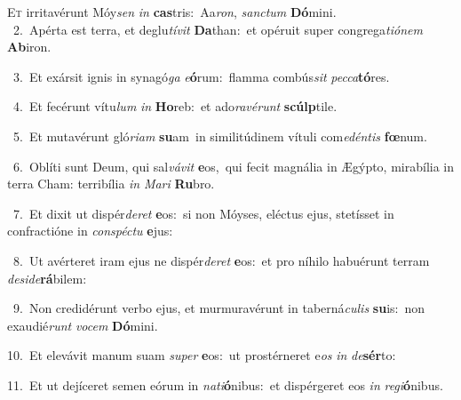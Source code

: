 \lettrine{\initial\textcolor{\initialcolor}{E}}{t} irritavérunt Móy\textit{sen} \textit{in} \textbf{cas}\-tris:~\star Aa\-\textit{ron}\-, \textit{sanc}\-\textit{tum} \textbf{Dó}\-mini.\\
{\numbfont\textcolor{\numbcolor}{~2.}}~Apérta est terra, et deglu\-\textit{tí}\-\textit{vit} \textbf{Da}\-than:~\star et opéruit super congrega\-\textit{ti}\-\textit{ó}\textit{nem} \textbf{Ab}\-iron.\par
{\numbfont\textcolor{\numbcolor}{~3.}}~Et exársit ignis in synagó\textit{ga} \textit{e}\-\textbf{ó}rum:~\star flamma combús\textit{sit} \textit{pec}\-\textit{ca}\textbf{tó}res.\par
{\numbfont\textcolor{\numbcolor}{~4.}}~Et fecérunt vítu\textit{lum} \textit{in} \textbf{Ho}\-reb:~\star et ado\-\textit{ra}\-\textit{vé}\textit{runt} \textbf{scúlp}\-tile.\par
{\numbfont\textcolor{\numbcolor}{~5.}}~Et mutavérunt gló\-\textit{ri}\-\textit{am} \textbf{su}\-am~\star in similitúdinem vítuli com\-\textit{e}\-\textit{dén}\textit{tis} \textbf{fœ}\-num.\par
{\numbfont\textcolor{\numbcolor}{~6.}}~Oblíti sunt Deum, qui sal\-\textit{vá}\-\textit{vit} \textbf{e}\-os,~\star qui fecit magnália in Ægýpto, mirabília in terra Cham: terribília \textit{in} \textit{Ma}\-\textit{ri} \textbf{Ru}\-bro.\par
{\numbfont\textcolor{\numbcolor}{~7.}}~Et dixit ut dispér\-\textit{de}\-\textit{ret} \textbf{e}\-os:~\star si non Móyses, eléctus ejus, stetísset in confractióne in \textit{con}\-\textit{spéc}\textit{tu} \textbf{e}\-jus:\par
{\numbfont\textcolor{\numbcolor}{~8.}}~Ut avérteret iram ejus ne dispér\-\textit{de}\-\textit{ret} \textbf{e}\-os:~\star et pro níhilo habuérunt terram \textit{de}\-\textit{si}\textit{de}\textbf{rá}bilem:\par
{\numbfont\textcolor{\numbcolor}{~9.}}~Non credidérunt verbo ejus, et murmuravérunt in taberná\-\textit{cu}\-\textit{lis} \textbf{su}\-is:~\star non exaudié\textit{runt} \textit{vo}\-\textit{cem} \textbf{Dó}\-mini.\par
{\numbfont\textcolor{\numbcolor}{10.}}~Et elevávit manum suam \textit{su}\-\textit{per} \textbf{e}\-os:~\star ut prostérneret e\textit{os} \textit{in} \textit{de}\-\textbf{sér}to:\par
{\numbfont\textcolor{\numbcolor}{11.}}~Et ut dejíceret semen eórum in \textit{na}\-\textit{ti}\textbf{ó}nibus:~\star et dispérgeret eos \textit{in} \textit{re}\-\textit{gi}\textbf{ó}nibus.\par
